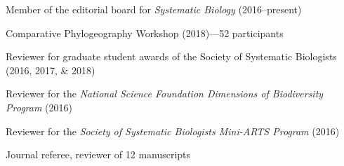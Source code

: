 \begin{veryTightItemize}
    \item Member of the editorial board for \emph{Systematic Biology}
        (2016--present)
    \item Comparative Phylogeography Workshop (2018)---52 participants
    \item Reviewer for graduate student awards of the Society of Systematic
        Biologists (2016, 2017, \& 2018)
    \item Reviewer for the \emph{National Science Foundation Dimensions of
            Biodiversity Program} (2016)
    \item Reviewer for the \emph{Society of Systematic Biologists Mini-ARTS
            Program} (2016)
    \item Journal referee, reviewer of 12 manuscripts
\end{veryTightItemize}
